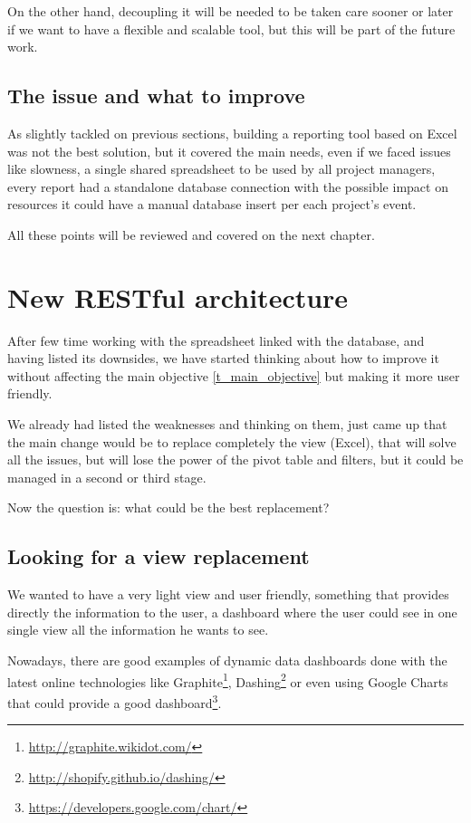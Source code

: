 

On the other hand, decoupling it will be needed to be taken care sooner or
later if we want to have a flexible and scalable tool, but this will be part of the
future work.

\section{The issue and what to improve}
As slightly tackled on previous sections, building a reporting tool based on
Excel was not the best solution, but it covered the main needs, even if we
faced issues like slowness, a single shared spreadsheet to be used by all
project managers, every report had a standalone database connection with the
possible impact on resources it could have a manual database insert per
each project's event.

All these points will be reviewed and covered on the next chapter. 

\chapter{New RESTful architecture}
After few time working with the spreadsheet linked with the database, and having
listed its downsides, we have started thinking about how to improve it without
affecting the main objective \ref{t_main_objective} but making it more
user friendly.

We already had listed the weaknesses and thinking on them, just came
up that the main change would be to replace completely the view (Excel), that
will solve all the issues, but will lose the power of the pivot table and
filters, but it could be managed in a second or third stage.

Now the question is: what could be the best replacement?

\section{Looking for a view replacement}
We wanted to have a very light view and user friendly, something that
provides directly the information to the user, a dashboard where the user could
see in one single view all the information he wants to see.

Nowadays, there are good examples of dynamic data dashboards done with the
latest online technologies like
Graphite\footnote{\url{http://graphite.wikidot.com/}},
Dashing\footnote{\url{http://shopify.github.io/dashing/}} or even using Google
Charts that could provide a good
dashboard\footnote{\url{https://developers.google.com/chart/}}.  

